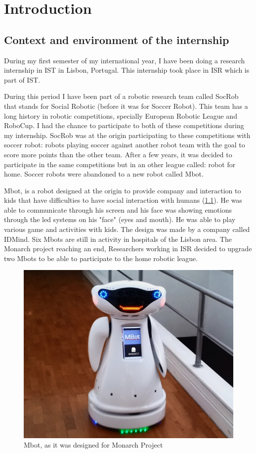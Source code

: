 
\chapter{Introduction}
\label{chapter:introduction}
\section{Context and environment of the internship}

During my first semester of my international year, I have been doing a research internship in \gls{IST} in Lisbon, Portugal. This internship took place in \gls{ISR} which is part of \gls{IST}.

During this period I have been part of a robotic research team called SocRob that stands for Social Robotic (before it was for Soccer Robot). This team has a long history in robotic competitions, specially European Robotic League and RoboCup. I had the chance to participate to both of these competitions during my internship. SocRob was at the origin participating to these competitions with soccer robot: robots playing soccer against another robot team with the goal to score more points than the other team. After a few years, it was decided to participate in the same competitions but in an other league called: robot for home. Soccer robots were abandoned to a new robot called \gls{Mbot}.

\gls{Mbot}, is a robot designed at the origin to provide company and interaction to kids that have difficulties to have social interaction with humans (\ref{Mbot}). He was able to communicate through his screen and his face was showing emotions through the led systems on his "face" (eyes and mouth). He was able to play various game and activities with kids. The design was made by a company called IDMind. Six \glspl{Mbot} are still in activity in hospitals of the Lisbon area. The Monarch project reaching an end, Researchers working in \gls{ISR} decided to upgrade two \glspl{Mbot} to be able to participate to the home robotic league. \\[0.05cm]

\begin{figure} [!h]
    \centering
    \includegraphics[width=0.30\linewidth]{images/MBOT_01s.jpg}
    \caption{Mbot, as it was designed for Monarch Project}
    \label{Mbot}
\end{figure}
\newpage

